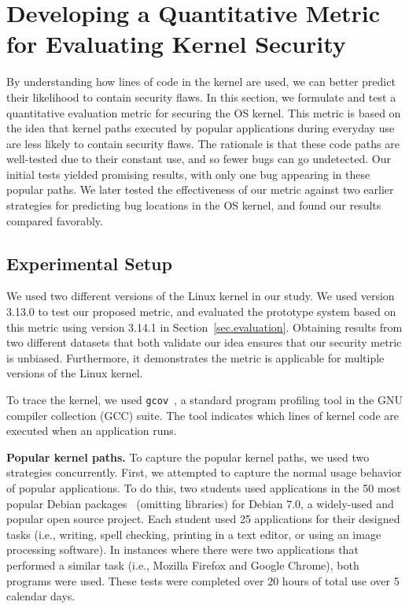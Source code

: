 \section{Developing a Quantitative Metric for Evaluating Kernel Security}
\label{sec.metric}

By understanding how lines of code in the kernel are used, we can better predict their
likelihood to contain security flaws. In this section, we formulate and test
a quantitative evaluation metric for securing the OS kernel.
This metric is based on the idea that kernel paths executed by popular applications
during everyday use are less likely to contain security flaws.
The rationale is that these code paths are well-tested due to their constant use, and so
fewer bugs can go undetected. Our initial tests yielded promising results, with only one
bug appearing in these popular paths.  We later tested the effectiveness
of our metric against two earlier strategies for predicting bug
locations in the OS kernel, and found our results compared favorably.

\subsection{Experimental Setup}\label{sec-setup}
We used two different versions of
the Linux kernel in our study.
We used version 3.13.0 to test our proposed metric, and evaluated the prototype system based on this
 metric using version 3.14.1 in
Section~\ref{sec.evaluation}. Obtaining results from two different datasets that both validate
our idea ensures that our security metric is unbiased. Furthermore,
it demonstrates the metric is applicable
for multiple versions of the Linux kernel.

To trace the kernel, we used \texttt{gcov}~\cite{gcov}, a standard program profiling
tool in the GNU compiler collection (GCC) suite. The tool indicates which lines of kernel
code are executed when an application runs.

\textbf{Popular kernel paths.}
To capture the popular kernel paths, we used two strategies concurrently.
First, we attempted to capture the normal usage behavior of popular applications.
To do this, two students used applications in the 50 most popular Debian
packages~\cite{Top-Packages} (omitting libraries) for Debian 7.0, a widely-used and
popular open source project.
Each student used 25 applications for their designed
tasks (i.e., writing, spell checking, printing in a text editor, or using
an image processing software). In instances where there were two applications that performed a
similar task (i.e., Mozilla Firefox and Google Chrome), both programs were
used. These tests were completed over 20 hours of
total use over 5 calendar days.

